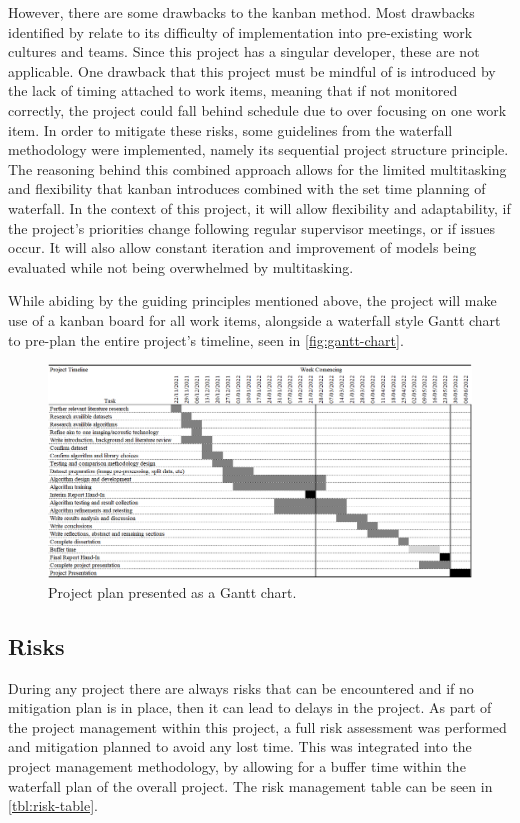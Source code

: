 However, there are some drawbacks to the kanban method. Most drawbacks identified by \cite{ahmad2013kanban} relate to its difficulty of implementation into pre-existing work cultures and teams. Since this project has a singular developer, these are not applicable. One drawback that this project must be mindful of is introduced by the lack of timing attached to work items, meaning that if not monitored correctly, the project could fall behind schedule due to over focusing on one work item. In order to mitigate these risks, some guidelines from the waterfall methodology were implemented, namely its sequential project structure principle. The reasoning behind this combined approach allows for the limited multitasking and flexibility that kanban introduces combined with the set time planning of waterfall. In the context of this project, it will allow flexibility and adaptability, if the project's priorities change following regular supervisor meetings, or if issues occur. It will also allow constant iteration and improvement of models being evaluated while not being overwhelmed by multitasking.

While abiding by the guiding principles mentioned above, the project will make use of a kanban board for all work items, alongside a waterfall style Gantt chart to pre-plan the entire project's timeline, seen in \autoref{fig:gantt-chart}.

\begin{figure}[H]
    \centering
    \includegraphics[width=\textwidth]{figures/gantt-chart.png}
    \caption{Project plan presented as a Gantt chart.}
    \label{fig:gantt-chart}
\end{figure}

\subsection{Risks} \label{risks}
During any project there are always risks that can be encountered and if no mitigation plan is in place, then it can lead to delays in the project. As part of the project management within this project, a full risk assessment was performed and mitigation planned to avoid any lost time. This was integrated into the project management methodology, by allowing for a buffer time within the waterfall plan of the overall project. The risk management table can be seen in \autoref{tbl:risk-table}.


